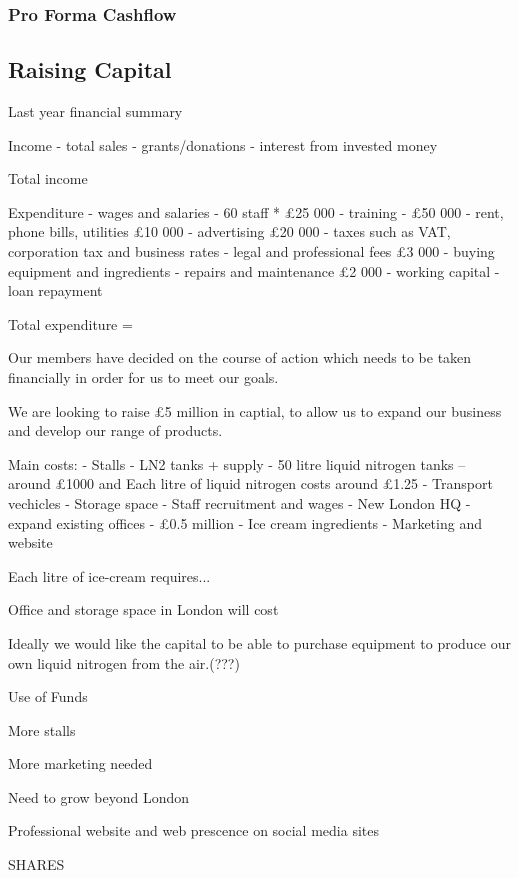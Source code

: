 \documentclass{article}
\begin{document}
\subsubsection{Pro Forma Cashflow}

\subsection{Raising Capital}



Last year financial summary

Income
 - total sales       
 - grants/donations
 - interest from invested money

 Total income

 Expenditure
 - wages and salaries - 60 staff * £25 000
 - training - £50 000
 - rent, phone bills, utilities £10 000
 - advertising £20 000
 - taxes such as VAT, corporation tax and business rates
 - legal and professional fees £3 000
 - buying equipment and ingredients 
 - repairs and maintenance £2 000
 - working capital 
 - loan repayment

 Total expenditure = 

Our members have decided on the course of action which needs to be taken financially in order for us to meet our goals.

We are looking to raise £5 million in captial, to allow us to expand our business and develop our range of products.

Main costs:
 - Stalls - LN2 tanks + supply - 50 litre liquid nitrogen tanks – around £1000 and Each litre of liquid nitrogen costs around £1.25
 - Transport vechicles
 - Storage space
 - Staff recruitment and wages
 - New London HQ - expand existing offices - £0.5 million
 - Ice cream ingredients
 - Marketing and website




Each litre of ice-cream requires...

Office and storage space in London will cost

Ideally we would like the capital to be able to purchase equipment to
produce our own liquid nitrogen from the air.(???)

Use of Funds

More stalls

More marketing needed

Need to grow beyond London

Professional website and web prescence on social media sites


SHARES
\end{document}
